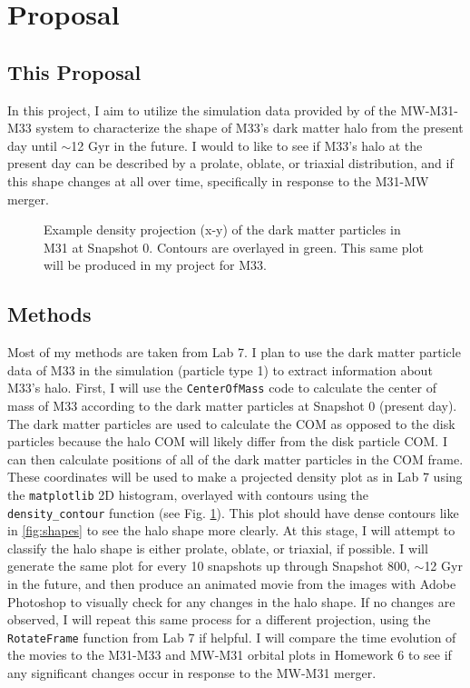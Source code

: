 \documentclass[twocolumn, linenumbers,trackchanges]{aastex7}
\begin{document}
\section{Proposal}
\subsection{This Proposal}
In this project, I aim to utilize the simulation data provided by \cite{Besla_2012} of the MW-M31-M33 system to characterize the shape of M33's dark matter halo from the present day until $\sim$12 Gyr in the future. I would to like to see if M33's halo at the present day can be described by a prolate, oblate, or triaxial distribution, and if this shape changes at all over time, specifically in response to the M31-MW merger.

\begin{figure}[ht!]
\caption{Example density projection (x-y) of the dark matter particles in M31 at Snapshot 0. Contours are overlayed in green. This same plot will be produced in my project for M33. 
\label{fig:M31dens}}
\end{figure}

\subsection{Methods} 
Most of my methods are taken from Lab 7. I plan to use the dark matter particle data of M33 in the simulation (particle type 1) to extract information about M33's halo. First, I will use the \texttt{CenterOfMass} code to calculate the center of mass of M33 according to the dark matter particles at Snapshot 0 (present day). The dark matter particles are used to calculate the COM as opposed to the disk particles because the halo COM will likely differ from the disk particle COM. I can then calculate positions of all of the dark matter particles in the COM frame. These coordinates will be used to make a projected density plot as in Lab 7 using the \texttt{matplotlib} 2D histogram, overlayed with contours using the \texttt{density\_contour} function (see Fig. \ref{fig:M31dens}). This plot should have dense contours like in \ref{fig:shapes} to see the halo shape more clearly. At this stage, I will attempt to classify the halo shape is either prolate, oblate, or triaxial, if possible. I will generate the same plot for every 10 snapshots up through Snapshot 800, $\sim$12 Gyr in the future, and then produce an animated movie from the images with Adobe Photoshop to visually check for any changes in the halo shape. If no changes are observed, I will repeat this same process for a different projection, using the \texttt{RotateFrame} function from Lab 7 if helpful. I will compare the time evolution of the movies to the M31-M33 and MW-M31 orbital plots in Homework 6 to see if any significant changes occur in response to the MW-M31 merger.
\end{document}
